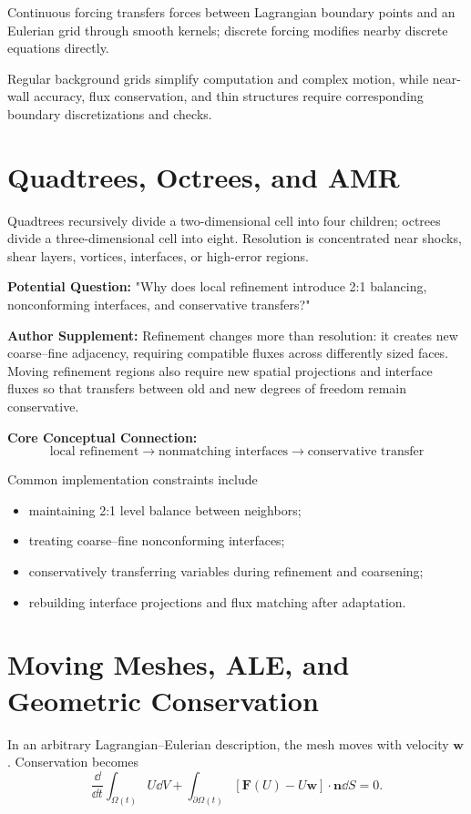 Continuous forcing transfers forces between Lagrangian boundary points and an Eulerian grid through smooth kernels; discrete forcing modifies nearby discrete equations directly.

Regular background grids simplify computation and complex motion, while near-wall accuracy, flux conservation, and thin structures require corresponding boundary discretizations and checks.

\section{Quadtrees, Octrees, and AMR}
Quadtrees recursively divide a two-dimensional cell into four children; octrees divide a three-dimensional cell into eight. Resolution is concentrated near shocks, shear layers, vortices, interfaces, or high-error regions.

\begin{authornote}
\textbf{Potential Question:}
"Why does local refinement introduce 2:1 balancing, nonconforming interfaces, and conservative transfers?"

\textbf{Author Supplement:}
Refinement changes more than resolution: it creates new coarse--fine adjacency, requiring compatible fluxes across differently sized faces. Moving refinement regions also require new spatial projections and interface fluxes so that transfers between old and new degrees of freedom remain conservative.

\textbf{Core Conceptual Connection:}
\[
\text{local refinement}
\longrightarrow
\text{nonmatching interfaces}
\longrightarrow
\text{conservative transfer}
\]
\end{authornote}

Common implementation constraints include
\begin{itemize}
  \item maintaining 2:1 level balance between neighbors;
  \item treating coarse--fine nonconforming interfaces;
  \item conservatively transferring variables during refinement and coarsening;
  \item rebuilding interface projections and flux matching after adaptation.
\end{itemize}

\section{Moving Meshes, ALE, and Geometric Conservation}
In an arbitrary Lagrangian--Eulerian description, the mesh moves with velocity \(\bm w\). Conservation becomes
\[
\frac{\dd}{\dd t}\int_{\Omega(t)}U\dd V
+
\int_{\partial\Omega(t)}
[\bm F(U)-U\bm w]\cdot\bm n\dd S
=0.
\]

